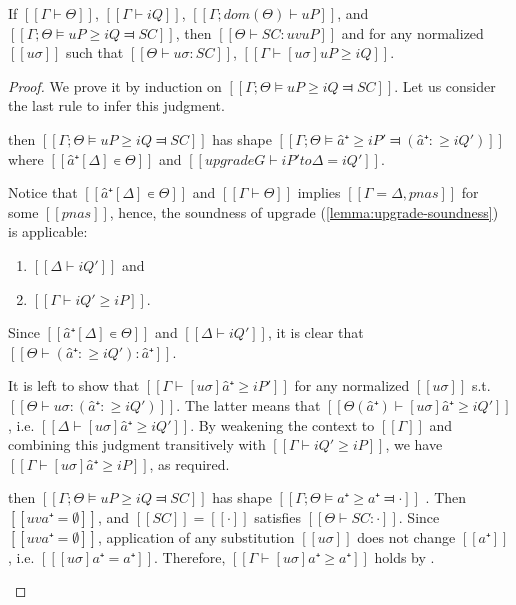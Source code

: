 \begin{lemma} \label{lemma:pos-subt-soundness}
    If $[[Γ ⊢ Θ]]$, $[[Γ ⊢ iQ]]$, $[[Γ ; dom(Θ) ⊢  uP]]$, and 
    $[[Γ ; Θ ⊨ uP ≥ iQ ⫤ SC]]$,
    then $[[Θ ⊢ SC : uv uP]]$ and
    for any normalized $[[uσ]]$ such that $[[ Θ ⊢ uσ : SC ]]$,
    $[[ Γ ⊢ [uσ]uP ≥ iQ ]]$.
\end{lemma}
\begin{proof} 
    We prove it by induction on $[[Γ ; Θ ⊨ uP ≥ iQ ⫤ SC]]$. 
    Let us consider the last rule to infer this judgment.
    \begin{caseof}
    \item {} then
        $[[Γ ; Θ ⊨ uP ≥ iQ ⫤ SC]]$ has shape $[[Γ;Θ ⊨ â⁺ ≥ iP' ⫤ (â⁺ :≥ iQ')]]$ where
        $[[â⁺[Δ] ∊ Θ]]$ and $[[upgrade G ⊢ iP' to Δ = iQ']]$.

        Notice that $[[â⁺[Δ] ∊ Θ]]$ and $[[Γ ⊢ Θ]]$ 
        implies $[[Γ = Δ, pnas]]$ for some $[[pnas]]$, hence, the
        soundness of upgrade (\cref{lemma:upgrade-soundness}) is applicable:
        \begin{enumerate}
            \item $[[Δ ⊢ iQ']]$ and
            \item $[[Γ ⊢ iQ' ≥ iP]]$.
        \end{enumerate}

        Since $[[â⁺[Δ] ∊ Θ]]$ and $[[Δ ⊢ iQ']]$, 
        it is clear that $[[ Θ ⊢ (â⁺ :≥ iQ') : {â⁺}]]$.

        It is left to show that $[[Γ ⊢ [uσ]â⁺ ≥ iP']]$ for any normalized $[[uσ]]$ 
        s.t. $[[ Θ   ⊢ uσ : (â⁺ :≥ iQ') ]]$.
        The latter means that $[[ Θ(â⁺) ⊢ [uσ]â⁺ ≥ iQ' ]]$, i.e. $[[Δ ⊢ [uσ]â⁺ ≥ iQ']]$. 
        By weakening the context to $[[Γ]]$ and combining this judgment
        transitively with $[[Γ ⊢ iQ' ≥ iP]]$, we have $[[Γ ⊢ [uσ]â⁺ ≥ iP]]$,
        as required. 

    \item \label{case:pos-subt-soundness:var}   
        then $[[Γ ; Θ ⊨ uP ≥ iQ ⫤ SC]]$ has shape $[[Γ;Θ ⊨ a⁺ ≥ a⁺ ⫤ ·]]$ .
        Then $[[uv a⁺ = ∅]]$, and $[[SC]] = [[·]]$ satisfies $[[Θ ⊢ SC : ·]]$.
        Since $[[uv a⁺ = ∅]]$, application of any substitution $[[uσ]]$ 
        does not change $[[a⁺]]$, i.e. $[[ [uσ] a⁺ = a⁺]]$.
        Therefore, $[[Γ ⊢ [uσ]a⁺ ≥ a⁺]]$ holds by .


\end{caseof}
\end{proof}
